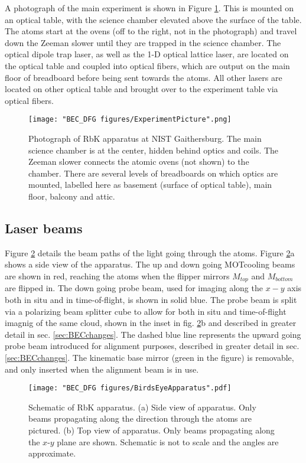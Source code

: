 A photograph of the main experiment is shown in Figure \ref{fig:ExperimentPicture}. This is mounted on an optical table, with the science chamber elevated above the surface of the table. The atoms start at the ovens (off to the right, not in the photograph) and travel down the Zeeman slower until they are trapped in the science chamber. The optical dipole trap laser, as well as the 1-D optical lattice laser, are located on the optical table and coupled into optical fibers, which are output on the main floor of breadboard before being sent towards the atoms. All other lasers are located on other optical table and brought over to the experiment table via optical fibers. 

\begin{figure}
	\texttt{[image: "BEC\_DFG figures/ExperimentPicture".png]}
\caption{Photograph of RbK apparatus at NIST Gaithersburg. The main science chamber is at the center, hidden behind optics and coils. The Zeeman slower connects the atomic ovens (not shown) to the chamber. There are several levels of breadboards on which optics are mounted, labelled here as basement (surface of optical table), main floor, balcony and attic.}
\label{fig:ExperimentPicture}
\end{figure}

\subsection{Laser beams}\label{sec:laserBeams}
Figure \ref{fig:BirdsEyeApparatus} details the beam paths of the light going through the atoms. Figure \ref{fig:BirdsEyeApparatus}a shows a side view of the apparatus. The up and down going MOTcooling beams are shown in red, reaching the atoms when the flipper mirrors $M_{top}$ and $M_{bottom}$ are flipped in. The down going probe beam, used for imaging along the $x-y$ axis both in situ and in time-of-flight, is shown in solid blue. The probe beam is split via a polarizing beam splitter cube to allow for both in situ and time-of-flight imagnig of the same cloud, shown in the inset in fig.  \ref{fig:BirdsEyeApparatus}b and described in greater detail in sec. \ref{sec:BECchanges}.  The dashed blue line represents the upward going probe beam introduced for alignment purposes, described in greater detail in sec. \ref{sec:BECchanges}. The kinematic base mirror (green in the figure) is removable, and only inserted when the alignment beam is in use. 

\begin{figure}
	\texttt{[image: "BEC\_DFG figures/BirdsEyeApparatus".pdf]}
\caption{Schematic of RbK apparatus. (a) Side view of apparatus. Only beams propagating along the \ez{} direction through the atoms are pictured. (b) Top view of apparatus. Only beams propagating along the $x$-$y$ plane are shown. Schematic is not to scale and the angles are approximate.}
\label{fig:BirdsEyeApparatus}
\end{figure}


